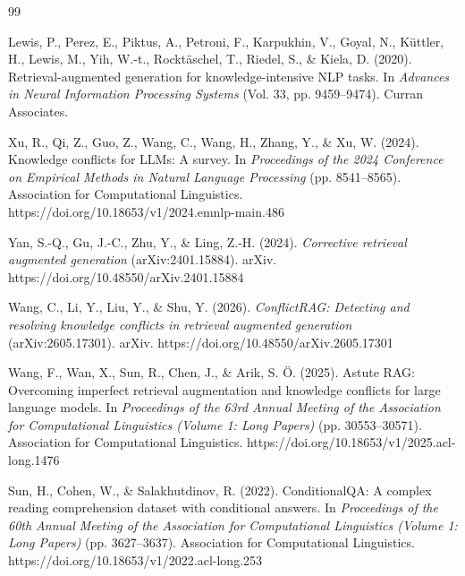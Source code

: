 \renewcommand{\refname}{\fontsize{12}{12}\selectfont\textbf{References}}
\begin{thebibliography}{99}
\setlength{\itemsep}{2pt}
\fontsize{11}{13}\selectfont

 Lewis, P., Perez, E., Piktus, A., Petroni, F., Karpukhin, V., Goyal, N., K{\"u}ttler, H., Lewis, M., Yih, W.-t., Rockt{\"a}schel, T., Riedel, S., \& Kiela, D. (2020). Retrieval-augmented generation for knowledge-intensive NLP tasks. In \emph{Advances in Neural Information Processing Systems} (Vol. 33, pp. 9459--9474). Curran Associates.

 Xu, R., Qi, Z., Guo, Z., Wang, C., Wang, H., Zhang, Y., \& Xu, W. (2024). Knowledge conflicts for LLMs: A survey. In \emph{Proceedings of the 2024 Conference on Empirical Methods in Natural Language Processing} (pp. 8541--8565). Association for Computational Linguistics. https://doi.org/10.18653/v1/2024.emnlp-main.486

 Yan, S.-Q., Gu, J.-C., Zhu, Y., \& Ling, Z.-H. (2024). \emph{Corrective retrieval augmented generation} (arXiv:2401.15884). arXiv. https://doi.org/10.48550/arXiv.2401.15884

 Wang, C., Li, Y., Liu, Y., \& Shu, Y. (2026). \emph{ConflictRAG: Detecting and resolving knowledge conflicts in retrieval augmented generation} (arXiv:2605.17301). arXiv. https://doi.org/10.48550/arXiv.2605.17301

 Wang, F., Wan, X., Sun, R., Chen, J., \& Arik, S. {\"O}. (2025). Astute RAG: Overcoming imperfect retrieval augmentation and knowledge conflicts for large language models. In \emph{Proceedings of the 63rd Annual Meeting of the Association for Computational Linguistics (Volume 1: Long Papers)} (pp. 30553--30571). Association for Computational Linguistics. https://doi.org/10.18653/v1/2025.acl-long.1476

 Sun, H., Cohen, W., \& Salakhutdinov, R. (2022). ConditionalQA: A complex reading comprehension dataset with conditional answers. In \emph{Proceedings of the 60th Annual Meeting of the Association for Computational Linguistics (Volume 1: Long Papers)} (pp. 3627--3637). Association for Computational Linguistics. https://doi.org/10.18653/v1/2022.acl-long.253


\end{thebibliography}
